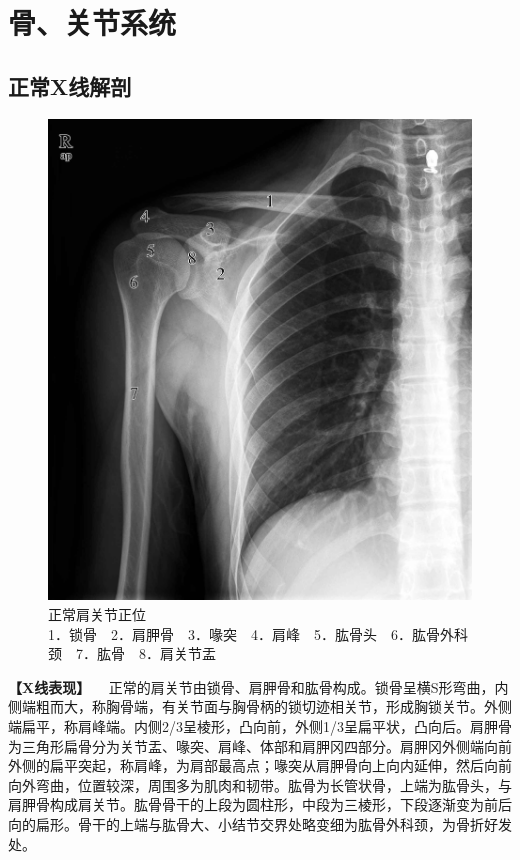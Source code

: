 \chapter{骨、关节系统}

\section{正常X线解剖}

\begin{figure}[!htbp]
 \centering
 \includegraphics{./images/Image00003.jpg}
 \captionsetup{justification=centering}
 \caption{正常肩关节正位\\{\small 1．锁骨　2．肩胛骨　3．喙突　4．肩峰　5．肱骨头　6．肱骨外科颈　7．肱骨　8．肩关节盂}}
 \label{fig2-1-1}
  \end{figure} 

\textbf{【X线表现】}
　正常的肩关节由锁骨、肩胛骨和肱骨构成。锁骨呈横S形弯曲，内侧端粗而大，称胸骨端，有关节面与胸骨柄的锁切迹相关节，形成胸锁关节。外侧端扁平，称肩峰端。内侧2/3呈棱形，凸向前，外侧1/3呈扁平状，凸向后。肩胛骨为三角形扁骨分为关节盂、喙突、肩峰、体部和肩胛冈四部分。肩胛冈外侧端向前外侧的扁平突起，称肩峰，为肩部最高点；喙突从肩胛骨向上向内延伸，然后向前向外弯曲，位置较深，周围多为肌肉和韧带。肱骨为长管状骨，上端为肱骨头，与肩胛骨构成肩关节。肱骨骨干的上段为圆柱形，中段为三棱形，下段逐渐变为前后向的扁形。骨干的上端与肱骨大、小结节交界处略变细为肱骨外科颈，为骨折好发处。

